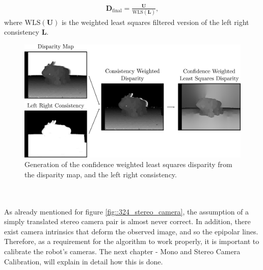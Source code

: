 \begin{align}
	\bm{D}_\text{final} = \frac{\bm{U}}{\text{WLS}(\bm{L})},
\end{align}
where $\text{WLS}(\bm{U})$ is the weighted least squares filtered version of the left right consistency $\bm{L}$.
\begin{figure}[h]
	\centering
	\includegraphics[scale=.28]{chapters/03_background/img/weighted_least_squares_disparity.png}
	\caption{Generation of the confidence weighted least squares disparity from the disparity map, and the left right consistency.}
	\label{fig::324_weighted_least_squares_disparity}
\end{figure}
\\\\
As already mentioned for figure \ref{fig::324_stereo_camera}, the assumption of a simply translated stereo camera pair is almost never correct. In addition, there exist camera intrinsics that deform the observed image, and so the epipolar lines. Therefore, as a requirement for the algorithm to work properly, it is important to calibrate the robot's cameras. The next chapter - Mono and Stereo Camera Calibration, will explain in detail how this is done.
